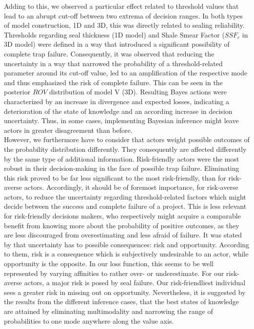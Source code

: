 	Adding to this, we observed a particular effect related to threshold values that lead to an abrupt cut-off between two extrema of decision ranges. In both types of model construction, 1D and 3D, this was directly related to sealing reliability. Thresholds regarding seal thickness (1D model) and Shale Smear Factor ($SSF_c$ in 3D model) were defined in a way that introduced a significant possibility of complete trap failure. Consequently, it was observed that reducing the uncertainty in a way that narrowed the probability of a threshold-related parameter around its cut-off value, led to an amplification of the respective mode and thus emphasized the risk of complete failure. This can be seen in the posterior $ROV$ distribution of model V (3D). Resulting Bayes actions were characterized by an increase in divergence and expected losses, indicating a deterioration of the state of knowledge and an according increase in decision uncertainty. Thus, in some cases, implementing Bayesian inference might leave actors in greater disagreement than before.\\
	However, we furthermore have to consider that actors weight possible outcomes of the probability distribution differently. They consequently are affected differently by the same type of additional information. Risk-friendly actors were the most robust in their decision-making in the face of possible trap failure. Eliminating this risk proved to be far less significant to the most risk-friendly, than for risk-averse actors. Accordingly, it should be of foremost importance, for risk-averse actors, to reduce the uncertainty regarding threshold-related factors which might decide between the success and complete failure of a project. This is less relevant for risk-friendly decisions makers, who respectively might acquire a comparable benefit from knowing more about the probability of positive outcomes, as they are less discouraged from overestimating and less afraid of failure. It was stated by \citet{bratvold2010making} that uncertainty has to possible consequences: risk and opportunity. According to them, risk is a consequence which is subjectively undesirable to an actor, while opportunity is the opposite. In our loss function, this seems to be well represented by varying affinities to rather over- or underestimate. For our risk-averse actors, a major risk is posed by seal failure. Our risk-friendliest individual sees a greater risk in missing out on opportunity. Nevertheless, it is suggested by the results from the different inference cases, that the best states of knowledge are attained by eliminating multimodality and narrowing the range of probabilities to one mode anywhere along the value axis.\\
